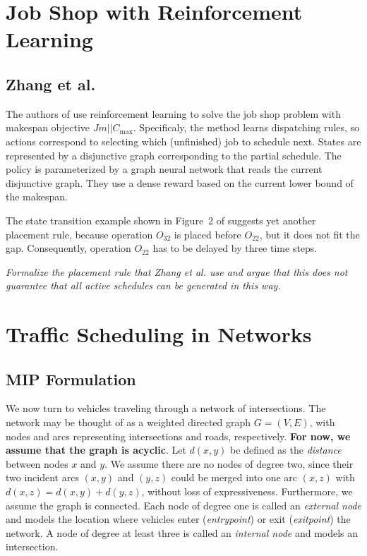 \documentclass{article}
\theoremstyle{definition}
\theoremstyle{plain}
\begin{document}
\newpage

\section{Job Shop with Reinforcement Learning}

\subsection{Zhang et al.}

The authors of \cite{zhangLearningDispatchJob2020} use reinforcement learning to
solve the job shop problem with makespan objective $Jm || C_\text{max}$.
Specificaly, the method learns dispatching rules, so actions correspond to
selecting which (unfinished) job to schedule next. States are represented by a
disjunctive graph corresponding to the partial schedule. The policy is
parameterized by a graph neural network that reads the current disjunctive
graph. They use a dense reward based on the current lower bound of the makespan.



The state transition example shown in Figure~2 of
\cite{zhangLearningDispatchJob2020} suggests yet another placement rule, because
operation $O_{32}$ is placed before $O_{22}$, but it does not fit the gap.
Consequently, operation $O_{22}$ has to be delayed by three time steps.

\textit{\color{blue}Formalize the placement rule that Zhang et al. use and argue
that this does not guarantee that all active schedules can be generated in this
way.}



\newpage

\section{Traffic Scheduling in Networks}

\subsection{MIP Formulation}
We now turn to vehicles traveling through a network of intersections. The
network may be thought of as a weighted directed graph $G=(V,E)$, with nodes and
arcs representing intersections and roads, respectively. \textbf{For now, we
  assume that the graph is acyclic}. Let $d(x,y)$ be defined as the
\textit{distance} between nodes $x$ and $y$. We assume there are no nodes of
degree two, since their two incident arcs $(x,y)$ and $(y,z)$ could be merged
into one arc $(x,z)$ with $d(x,z) = d(x,y) + d(y,z)$, without loss of
expressiveness. Furthermore, we assume the graph is connected. Each node of
degree one is called an \textit{external node} and models the location where
vehicles enter (\textit{entrypoint}) or exit (\textit{exitpoint}) the network. A
node of degree at least three is called an \textit{internal node} and models an
intersection.
\end{document}
